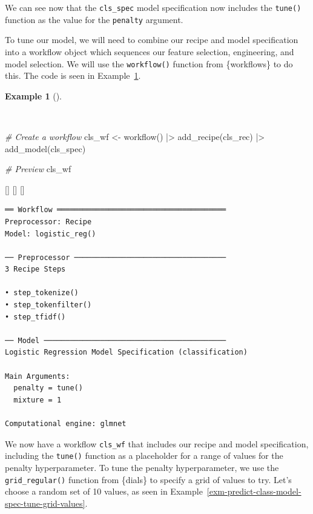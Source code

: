 \documentclass[
  letterpaper,
  krantz1]{latex/krantz-mod}
\newenvironment{Shaded}{\begin{snugshade}}{\end{snugshade}}
\newcommand{\CommentTok}[1]{\textcolor[rgb]{0.00,0.00,0.00}{\textit{#1}}}
\newcommand{\FunctionTok}[1]{\textcolor[rgb]{0.00,0.00,0.00}{#1}}
\newcommand{\NormalTok}[1]{\textcolor[rgb]{0.00,0.00,0.00}{#1}}
\newcommand{\OtherTok}[1]{\textcolor[rgb]{0.00,0.00,0.00}{#1}}
\newcommand{\SpecialCharTok}[1]{\textcolor[rgb]{0.00,0.00,0.00}{#1}}
\newcommand{\cindex}[1]{%
  \StrSubstitute{#1}{_}{\_}[\temp]%
  \index{\temp}%
}
\theoremstyle{definition}
\theoremstyle{definition}
\newtheorem{example}{Example}[chapter]
\theoremstyle{remark}
\begin{document}
We can see now that the \texttt{cls\_spec} model specification now
includes the \texttt{tune()} function as the value for the
\texttt{penalty} argument.

To tune our model, we will need to combine our recipe and model
specification into a workflow object which sequences our feature
selection, engineering, and model selection. We will use the
\texttt{workflow()} function from \{workflows\} to do this. The code is
seen in Example~\ref{exm-predict-class-workflow}.

\begin{example}[]\protect\hypertarget{exm-predict-class-workflow}{}\label{exm-predict-class-workflow}

~

\begin{Shaded}
\begin{Highlighting}[numbers=left,,]
\CommentTok{\# Create a workflow}
\NormalTok{cls\_wf }\OtherTok{\textless{}{-}}
  \FunctionTok{workflow}\NormalTok{() }\SpecialCharTok{|\textgreater{}}
  \FunctionTok{add\_recipe}\NormalTok{(cls\_rec) }\SpecialCharTok{|\textgreater{}}
  \FunctionTok{add\_model}\NormalTok{(cls\_spec)}

\CommentTok{\# Preview}
\NormalTok{cls\_wf}
\end{Highlighting}
\end{Shaded}

\cindex{workflow()}\cindex{add_recipe()}\cindex{add_model()}

\begin{verbatim}
══ Workflow ═══════════════════════════════════════
Preprocessor: Recipe
Model: logistic_reg()

── Preprocessor ───────────────────────────────────
3 Recipe Steps

• step_tokenize()
• step_tokenfilter()
• step_tfidf()

── Model ──────────────────────────────────────────
Logistic Regression Model Specification (classification)

Main Arguments:
  penalty = tune()
  mixture = 1

Computational engine: glmnet
\end{verbatim}

\end{example}

We now have a workflow \texttt{cls\_wf} that includes our recipe and
model specification, including the \texttt{tune()} function as a
placeholder for a range of values for the penalty hyperparameter. To
tune the penalty hyperparameter, we use the
\texttt{grid\_regular()} function from \{dials\} to specify a grid of
values to try. Let's choose a random set of 10 values, as seen in
Example~\ref{exm-predict-class-model-spec-tune-grid-values}.
\end{document}
